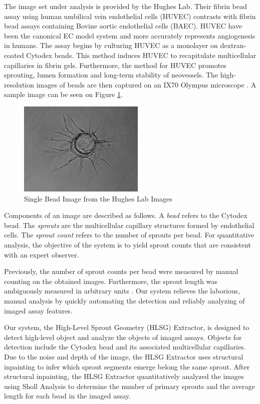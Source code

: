 \documentclass{sig-alternate}
\begin{document}
	The image set under analysis is provided by the Hughes Lab. Their
	fibrin bead assay using human umbilical vein endothelial cells (HUVEC)
	contrasts with fibrin bead assays containing Bovine aortic endothelial
	cells (BAEC). HUVEC have been the canonical EC model system and more
	accurately represents angiogenesis in humans. The assay begins by
	culturing HUVEC as a monolayer on dextran-coated Cytodex beads. This
	method induces HUVEC to recapitulate multicellular capillaries in
	fibrin gels. Furthermore, the method for HUVEC promotes sprouting,
	lumen formation and long-term stability of neovessels. The
	high-resolution images of beads are then captured on an IX70 Olympus
	microscope \cite{nakatsu03}. A sample image can be seen on Figure
	\ref{fig:monobead}.

	\begin{figure}[ht]
		\centering
		\includegraphics[width=6cm]{images/mono.jpg}
		\caption{Single Bead Image from the Hughes Lab Images}
		\label{fig:monobead}
	\end{figure}

	Components of an image are described as follows. A \emph{bead} refers
	to the Cytodex bead. The \emph{sprouts} are the multicellular
	capillary structures formed by endothelial cells. The \emph{sprout
	count} refers to the number of sprouts per bead. For quantitative
	analysis, the objective of the system is to yield sprout counts that
	are consistent with an expert observer.

	Previously, the number of sprout counts per bead were measured by manual
	counting on the obtained images. Furthermore, the sprout length was
	ambiguously measured in arbitrary units \cite{nakatsu03}. Our system
	relieves the laborious, manual analysis by quickly automating the detection
	and reliably analyzing of imaged assay features.

	Our system, the High-Level Sprout Geometry (HLSG) Extractor, is
	designed to detect high-level object and analyze the objects of imaged
	assays. Objects for detection include the Cytodex bead and its
	associated multicellular capillaries. Due to the noise and depth of
	the image, the HLSG Extractor uses structural inpainting to infer
	which sprout segments emerge belong the same sprout. After structural
	inpainting, the HLSG Extractor quantitatively analyzed the images
	using Sholl Analysis to determine the number of primary sprouts and the
	average length for each bead in the imaged assay.
\end{document}
